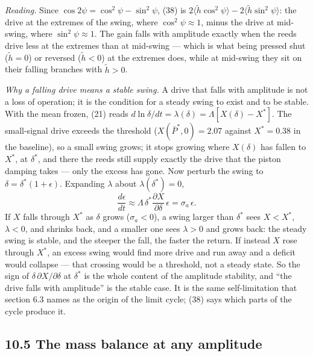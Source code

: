 \documentclass[11pt]{article}
\begin{document}
\emph{Reading.} Since $\cos 2\psi = \cos^2\psi - \sin^2\psi$, (38) is $2\langle\tilde h\cos^2\psi\rangle - 2\langle\tilde h\sin^2\psi\rangle$: the drive at the extremes of the swing, where $\cos^2\psi \approx 1$, minus the drive at mid-swing, where $\sin^2\psi \approx 1$. The gain falls with amplitude exactly when the reeds drive less at the extremes than at mid-swing --- which is what being pressed shut ($\tilde h = 0$) or reversed ($\tilde h < 0$) at the extremes does, while at mid-swing they sit on their falling branches with $\tilde h > 0$.

\emph{Why a falling drive means a stable swing.} A drive that falls with amplitude is not a loss of operation; it is the condition for a steady swing to exist and to be stable. With the mean frozen, (21) reads $d\ln\delta/dt = \lambda(\delta) = \Lambda[X(\delta) - X^*]$. The small-signal drive exceeds the threshold ($X(\bar P^*, 0) = 2.07$ against $X^* = 0.38$ in the baseline), so a small swing grows; it stops growing where $X(\delta)$ has fallen to $X^*$, at $\delta^*$, and there the reeds still supply exactly the drive that the piston damping takes --- only the excess has gone. Now perturb the swing to $\delta = \delta^*(1 + \epsilon)$. Expanding $\lambda$ about $\lambda(\delta^*) = 0$,
\[
\frac{d\epsilon}{dt} \approx \Lambda\,\delta^*\frac{\partial X}{\partial\delta}\,\epsilon = \sigma_a\,\epsilon .
\]
If $X$ falls through $X^*$ as $\delta$ grows ($\sigma_a < 0$), a swing larger than $\delta^*$ sees $X < X^*$, $\lambda < 0$, and shrinks back, and a smaller one sees $\lambda > 0$ and grows back: the steady swing is stable, and the steeper the fall, the faster the return. If instead $X$ rose through $X^*$, an excess swing would find more drive and run away and a deficit would collapse --- that crossing would be a threshold, not a steady state. So the sign of $\delta\,\partial X/\partial\delta$ at $\delta^*$ is the whole content of the amplitude stability, and ``the drive falls with amplitude'' is the stable case. It is the same self-limitation that section 6.3 names as the origin of the limit cycle; (38) says which parts of the cycle produce it.

\subsection*{10.5 The mass balance at any amplitude}
\end{document}
